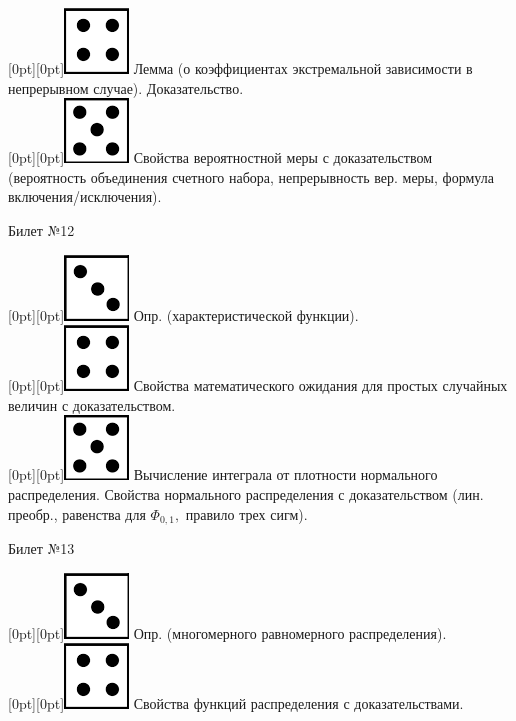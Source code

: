 \documentclass[10pt]{article}
\begin{document}
\raisebox{-1pt}[0pt][0pt]{\includegraphics[width=0.02\linewidth]{4.png}} Лемма (о коэффициентах экстремальной зависимости в непрерывном случае). Доказательство. \\

\raisebox{-1pt}[0pt][0pt]{\includegraphics[width=0.02\linewidth]{5.png}} Свойства  вероятностной меры с доказательством (вероятность объединения счетного набора, непрерывность вер. меры, формула включения/исключения). \\

\begin{center} {\Large Билет №12} \end{center} 

\raisebox{-1pt}[0pt][0pt]{\includegraphics[width=0.02\linewidth]{3.png}} Опр. (характеристической функции). \\

\raisebox{-1pt}[0pt][0pt]{\includegraphics[width=0.02\linewidth]{4.png}} Свойства математического ожидания для  простых случайных величин с доказательством. \\

\raisebox{-1pt}[0pt][0pt]{\includegraphics[width=0.02\linewidth]{5.png}} Вычисление интеграла от плотности нормального распределения.  Свойства нормального распределения с доказательством (лин. преобр., равенства для $\Phi_{0,1},$ правило трех сигм). \\

\begin{center} {\Large Билет №13} \end{center} 

\raisebox{-1pt}[0pt][0pt]{\includegraphics[width=0.02\linewidth]{3.png}} Опр. (многомерного равномерного распределения). \\

\raisebox{-1pt}[0pt][0pt]{\includegraphics[width=0.02\linewidth]{4.png}} Свойства функций распределения с доказательствами. \\
\end{document}
